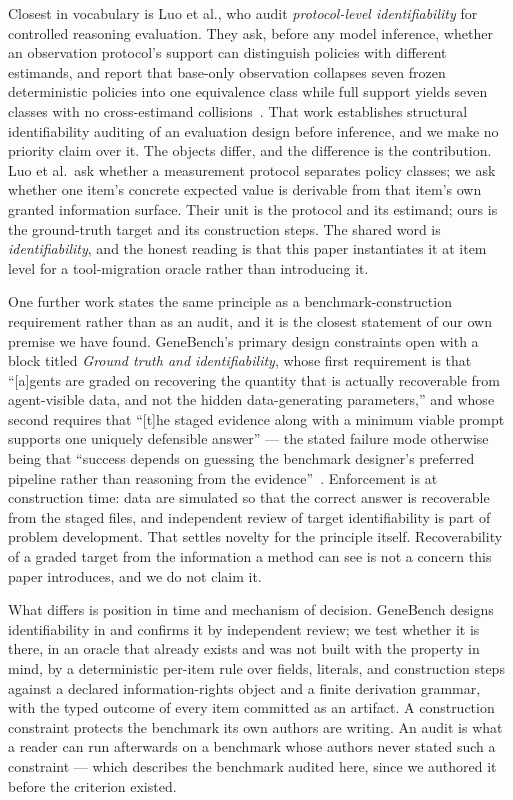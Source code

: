 \documentclass[11pt]{article}
\begin{document}
Closest in vocabulary is Luo et al., who audit \emph{protocol-level
identifiability} for controlled reasoning evaluation. They ask, before any
model inference, whether an observation protocol's support can distinguish
policies with different estimands, and report that base-only observation
collapses seven frozen deterministic policies into one equivalence class while
full support yields seven classes with no cross-estimand
collisions~\cite{luo2026identifiability}. That work establishes structural
identifiability auditing of an evaluation design before inference, and we make
no priority claim over it. The objects differ, and the difference is the
contribution. Luo et al.\ ask whether a measurement protocol separates policy
classes; we ask whether one item's concrete expected value is derivable from
that item's own granted information surface. Their unit is the protocol and its
estimand; ours is the ground-truth target and its construction steps. The
shared word is \emph{identifiability}, and the honest reading is that this
paper instantiates it at item level for a tool-migration oracle rather than
introducing it.

One further work states the same principle as a benchmark-construction
requirement rather than as an audit, and it is the closest statement of our own
premise we have found. GeneBench's primary design constraints open with a block
titled \emph{Ground truth and identifiability}, whose first requirement is that
``[a]gents are graded on recovering the quantity that is actually recoverable
from agent-visible data, and not the hidden data-generating parameters,'' and
whose second requires that ``[t]he staged evidence along with a minimum viable
prompt supports one uniquely defensible answer'' --- the stated failure mode
otherwise being that ``success depends on guessing the benchmark designer's
preferred pipeline rather than reasoning from the
evidence''~\cite{li2026genebench}. Enforcement is at construction time: data
are simulated so that the correct answer is recoverable from the staged files,
and independent review of target identifiability is part of problem
development. That settles novelty for the principle itself. Recoverability of a
graded target from the information a method can see is not a concern this paper
introduces, and we do not claim it.

What differs is position in time and mechanism of decision. GeneBench designs
identifiability in and confirms it by independent review; we test whether it is
there, in an oracle that already exists and was not built with the property in
mind, by a deterministic per-item rule over fields, literals, and construction
steps against a declared information-rights object and a finite derivation
grammar, with the typed outcome of every item committed as an artifact. A
construction constraint protects the benchmark its own authors are writing. An
audit is what a reader can run afterwards on a benchmark whose authors never
stated such a constraint --- which describes the benchmark audited here, since
we authored it before the criterion existed.
\end{document}
